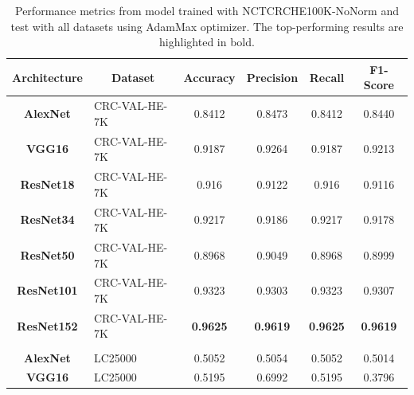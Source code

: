 \begin{table}[t!]
\centering

\caption{Performance metrics from model trained with \gls{NCTCRCHE100K}-NoNorm and test with all datasets using AdamMax optimizer. The top-performing results are highlighted in bold.}
\label{table_NCTCRCHE100K-nonorm_adammax}

\begin{tabular}{|c|l|c|c|c|c|}
\hline
\textbf{Architecture}  & \multicolumn{1}{c|}{\textbf{Dataset}} & \textbf{Accuracy}          & \textbf{Precision}    & \textbf{Recall}       & \textbf{F1-Score}     \\ \hline
\textbf{AlexNet}       & CRC-VAL-HE-7K                         & 0.8412                & 0.8473                & 0.8412                & 0.8440                \\ \hline
\textbf{VGG16}         & CRC-VAL-HE-7K                         & 0.9187                & 0.9264                & 0.9187                & 0.9213                \\ \hline
\textbf{ResNet18}      & CRC-VAL-HE-7K                         & 0.916                 & 0.9122                & 0.916                 & 0.9116                \\ \hline
\textbf{ResNet34}      & CRC-VAL-HE-7K                         & 0.9217                & 0.9186                & 0.9217                & 0.9178                \\ \hline
\textbf{ResNet50}      & CRC-VAL-HE-7K                         & 0.8968                & 0.9049                & 0.8968                & 0.8999                \\ \hline
\textbf{ResNet101}     & CRC-VAL-HE-7K                         & 0.9323                & 0.9303                & 0.9323                & 0.9307                \\ \hline
\textbf{ResNet152}     & CRC-VAL-HE-7K                         & \textbf{0.9625}                & \textbf{0.9619}                & \textbf{0.9625}                & \textbf{0.9619}                \\ \hline
\multicolumn{1}{|l|}{} &                                       & \multicolumn{1}{l|}{} & \multicolumn{1}{l|}{} & \multicolumn{1}{l|}{} & \multicolumn{1}{l|}{} \\ \hline
\textbf{AlexNet}       & LC25000                               & 0.5052                & 0.5054                & 0.5052                & 0.5014                \\ \hline
\textbf{VGG16}         & LC25000                               & 0.5195                & 0.6992                & 0.5195                & 0.3796                \\ \hline

\end{tabular}
\end{table}
